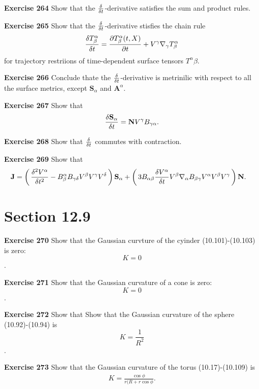 \documentclass[12pt,a4paper]{report}
\begin{document}
\begin{description}
\item \textbf{Exercise 264} Show that the $\frac{\delta }{\delta t}$-derivative satisfies the sum and product rules.

\item \textbf{Exercise 265} Show that the $\frac{\delta }{\delta t}$-derivative stisfies the chain rule
\begin{align*}
	\frac{\delta T^\alpha_\beta}{\delta t} = \frac{\partial T^\alpha_\beta(t,X)}{\partial t} + V^\gamma\nabla_\gamma T^\alpha_\beta
\end{align*}for trajectory restriions of time-dependent surface tensors $T^\alpha\beta$.

\item \textbf{Exercise 266} Conclude thate the $\frac{\delta }{\delta t}$-derivative is metrinilic with respect to all the surface metrics, except $\textbf{S}_\alpha$ and $\textbf{A}^\alpha$.

\item \textbf{Exercise 267} Show that 
\begin{align*}
	\frac{\delta \textbf{S}_\alpha}{\delta t} = \textbf{N} V^\gamma B_{\gamma\alpha}.
\end{align*}

\item \textbf{Exercise 268} Show that $\frac{\delta }{\delta t}$ commutes with contraction.

\item \textbf{Exercise 269} Show that 
\begin{align*}
	\textbf{J} &= \left (\, \frac{\delta^2 V^\alpha}{\delta t^2}- B^\alpha_\beta B_{\gamma\delta}V^\beta V^\gamma V^\delta \,\right )\textbf{S}_\alpha + \left (\, 3 B_{\alpha\beta}\frac{\delta V^\alpha}{\delta t} V^\beta  \nabla_\alpha B_{\beta\gamma} V^\alpha V^\beta V^\gamma \,\right )\textbf{N}.
\end{align*}

\section*{Section 12.9}
\item \textbf{Exercise 270} Show that the Gaussian curvture of the cyinder (10.101)-(10.103) is zero: $$K=0$$.

\item \textbf{Exercise 271} Show that the Gaussian curvature of a cone is zero: $$K=0$$.

\item \textbf{Exercise 272} Show that Show that the Gaussian curvature of the sphere (10.92)-(10.94) is $$K = \frac{1}{R^2}$$.

\item \textbf{Exercise 273} Show that the Gaussian curvature of the torus (10.17)-(10.109) is 
\begin{align*}
	K = \frac{\cos \phi}{r(R+r\cos\phi}.
\end{align*}


\end{description}
\end{document}
